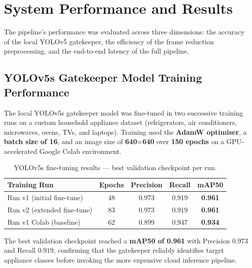 \section{System Performance and Results}
\label{sec:ch4-performance}

The pipeline's performance was evaluated across three dimensions: the accuracy of the local YOLOv5 gatekeeper, the efficiency of the frame reduction preprocessing, and the end-to-end latency of the full pipeline.

\subsection{YOLOv5s Gatekeeper Model Training Performance}

The local YOLOv5s gatekeeper model was fine-tuned in two successive training runs on a custom household appliance dataset (refrigerators, air conditioners, microwaves, ovens, TVs, and laptops). Training used the \textbf{AdamW optimiser}, a \textbf{batch size of 16}, and an image size of \textbf{640$\times$640} over \textbf{150 epochs} on a GPU-accelerated Google Colab environment.

\begin{table}[htbp]
\centering
\caption{YOLOv5s fine-tuning results — best validation checkpoint per run.}
\label{tab:ch4-yolo-training}
\begin{tabular}{lcccc}
\toprule
\textbf{Training Run} & \textbf{Epochs} & \textbf{Precision} & \textbf{Recall} & \textbf{mAP50} \\
\midrule
Run v1 (initial fine-tune)   & 48 & 0.973 & 0.919 & \textbf{0.961} \\
Run v2 (extended fine-tune)  & 83 & 0.973 & 0.919 & \textbf{0.961} \\
Run v1 Colab (baseline)      & 62 & 0.899 & 0.947 & \textbf{0.934} \\
\bottomrule
\end{tabular}
\end{table}

The best validation checkpoint reached a \textbf{mAP50 of 0.961} with Precision $0.973$ and Recall $0.919$, confirming that the gatekeeper reliably identifies target appliance classes before invoking the more expensive cloud inference pipeline.

